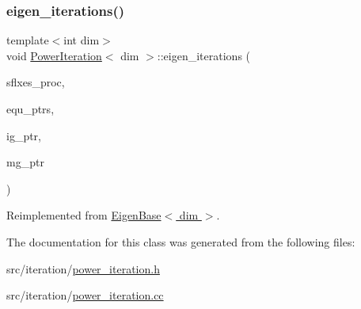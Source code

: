 \subsubsection{\texorpdfstring{eigen\+\_\+iterations()}{eigen\_iterations()}}
{\footnotesize\ttfamily template$<$int dim$>$ \\
void \hyperlink{class_power_iteration}{Power\+Iteration}$<$ dim $>$\+::eigen\+\_\+iterations (\begin{DoxyParamCaption}\item[{std\+::vector$<$ Vector$<$ double $>$ $>$ \&}]{sflxes\+\_\+proc,  }\item[{std\+::vector$<$ std\+\_\+cxx11\+::shared\+\_\+ptr$<$ \hyperlink{class_equation_base}{Equation\+Base}$<$ dim $>$ $>$ $>$ \&}]{equ\+\_\+ptrs,  }\item[{std\+\_\+cxx11\+::shared\+\_\+ptr$<$ \hyperlink{class_i_g_base}{I\+G\+Base}$<$ dim $>$ $>$}]{ig\+\_\+ptr,  }\item[{std\+\_\+cxx11\+::shared\+\_\+ptr$<$ \hyperlink{class_m_g_base}{M\+G\+Base}$<$ dim $>$ $>$}]{mg\+\_\+ptr }\end{DoxyParamCaption})\hspace{0.3cm}{\ttfamily [virtual]}}



Reimplemented from \hyperlink{class_eigen_base_ae09830ed4bcb14b7b699cd5f5460fab7}{Eigen\+Base$<$ dim $>$}.



The documentation for this class was generated from the following files\+:\begin{DoxyCompactItemize}
\item 
src/iteration/\hyperlink{power__iteration_8h}{power\+\_\+iteration.\+h}\item 
src/iteration/\hyperlink{power__iteration_8cc}{power\+\_\+iteration.\+cc}\end{DoxyCompactItemize}

